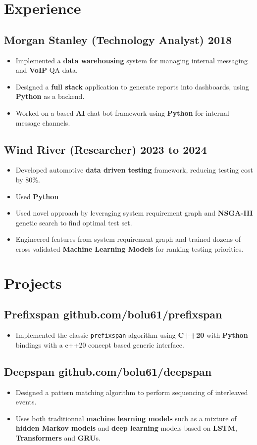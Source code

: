 \documentclass[10pt,letterpaper]{article}
\newcommand{\datedsubsection}[2]{\subsection[#1]{#1 \hfill #2}}
\renewcommand{\emph}[1]{{\color{emphcolor}\bfseries#1}}
\begin{document}
\section{Experience}

\datedsubsection{Morgan Stanley (Technology Analyst)}{2018}
\begin{itemize}
    \item Implemented a \emph{data warehousing} system for managing internal messaging and \emph{VoIP} QA data. 
    \item Designed a \emph{full stack} application to generate reports into
    dashboards, using \emph{Python} as a backend.
    \item Worked on a based \emph{AI} chat bot framework using \emph{Python} for
    internal message channels.
\end{itemize}

\datedsubsection{Wind River (Researcher)}{2023 to 2024}
\begin{itemize}
    \item Developed automotive \emph{data driven testing} framework, reducing testing cost by 80\%.
    \item Used \emph{Python}
    \item Used novel approach by leveraging system requirement graph and
    \emph{NSGA-III} genetic search to find optimal test set.
    \item Engineered features from system requirement graph and trained dozens of cross validated
    \emph{Machine Learning Models} for ranking testing priorities.
\end{itemize}

\section{Projects}
\subsection{Prefixspan github.com/bolu61/prefixspan}
\begin{itemize}
    \item Implemented the classic \verb|prefixspan| algorithm using \emph{C++20}
    with \emph{Python} bindings with a c++20 concept based generic interface.
\end{itemize}
\subsection{Deepspan github.com/bolu61/deepspan}
\begin{itemize}
    \item Designed a pattern matching algorithm to perform sequencing of interleaved events.
    \item Uses both traditionnal \emph{machine learning models} such as a
    mixture of \emph{hidden Markov models} and \emph{deep learning} models based
    on \emph{LSTM}, \emph{Transformers} and \emph{GRU}s.
\end{itemize}
\end{document}
